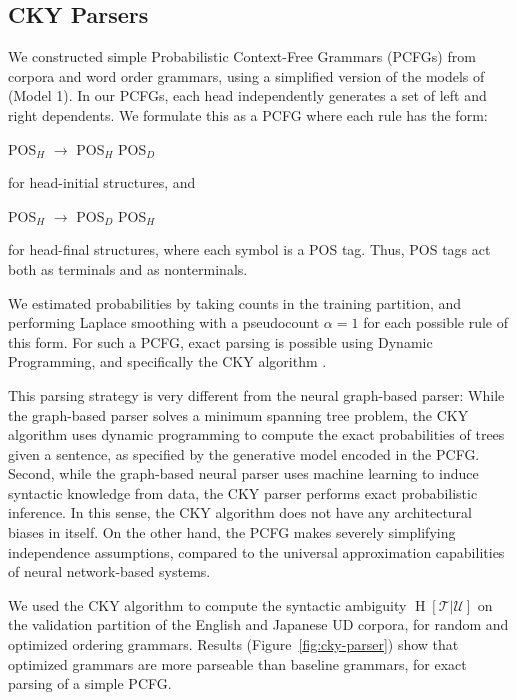 \documentclass[10pt,twoside,lineno]{article}
\newcommand{\utterance}{\mathcal{U}}
\newcommand{\tree}{\mathcal{T}}
\begin{document}
\subsection{CKY Parsers}


We constructed simple Probabilistic Context-Free Grammars (PCFGs) from corpora and word order grammars, using a simplified version of the models of \cite{collins2003head} (Model 1).
In our PCFGs, each head independently generates a set of left and right dependents.
We formulate this as a PCFG where each rule has the form:
\begin{center}
	POS$_H$ $\rightarrow$ POS$_H$ POS$_D$
\end{center}
for head-initial structures, and
\begin{center}
	POS$_H$ $\rightarrow$ POS$_D$ POS$_H$
\end{center}
for head-final structures, where each symbol is a POS tag.
Thus, POS tags act both as terminals and as nonterminals.

We estimated probabilities by taking counts in the training partition, and performing Laplace smoothing with a pseudocount $\alpha=1$ for each possible rule of this form.
For such a PCFG, exact parsing is possible using Dynamic Programming, and specifically the CKY algorithm \cite{kasami1966efficient}.

This parsing strategy is very different from the neural graph-based parser:
While the graph-based parser solves a minimum spanning tree problem, the CKY algorithm uses dynamic programming to compute the exact probabilities of trees given a sentence, as specified by the generative model encoded in the PCFG.
Second, while the graph-based neural parser uses machine learning to induce syntactic knowledge from data, the CKY parser performs exact probabilistic inference.
In this sense, the CKY algorithm does not have any architectural biases in itself.
On the other hand, the PCFG makes severely simplifying independence assumptions, compared to the universal approximation capabilities of neural network-based systems.

We used the CKY algorithm to compute the syntactic ambiguity $\operatorname{H}[\tree|\utterance]$ on the validation partition of the English and Japanese UD corpora, for random and optimized ordering grammars.
Results (Figure~\ref{fig:cky-parser}) show that optimized grammars are more parseable than baseline grammars, for exact parsing of a simple PCFG.
\end{document}
